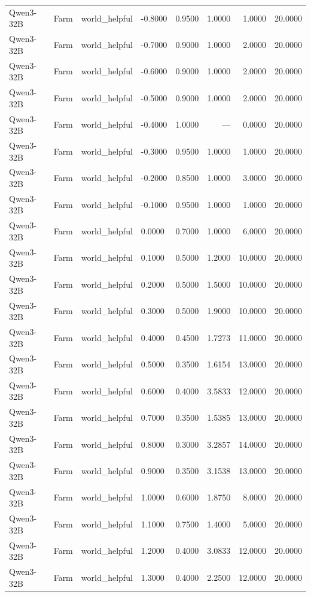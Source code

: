 \begin{table}
\begin{tabular}{llllrrrr}
Qwen3-32B & Farm & world_helpful & -0.8000 & 0.9500 & 1.0000 & 1.0000 & 20.0000 \\
Qwen3-32B & Farm & world_helpful & -0.7000 & 0.9000 & 1.0000 & 2.0000 & 20.0000 \\
Qwen3-32B & Farm & world_helpful & -0.6000 & 0.9000 & 1.0000 & 2.0000 & 20.0000 \\
Qwen3-32B & Farm & world_helpful & -0.5000 & 0.9000 & 1.0000 & 2.0000 & 20.0000 \\
Qwen3-32B & Farm & world_helpful & -0.4000 & 1.0000 & --- & 0.0000 & 20.0000 \\
Qwen3-32B & Farm & world_helpful & -0.3000 & 0.9500 & 1.0000 & 1.0000 & 20.0000 \\
Qwen3-32B & Farm & world_helpful & -0.2000 & 0.8500 & 1.0000 & 3.0000 & 20.0000 \\
Qwen3-32B & Farm & world_helpful & -0.1000 & 0.9500 & 1.0000 & 1.0000 & 20.0000 \\
Qwen3-32B & Farm & world_helpful & 0.0000 & 0.7000 & 1.0000 & 6.0000 & 20.0000 \\
Qwen3-32B & Farm & world_helpful & 0.1000 & 0.5000 & 1.2000 & 10.0000 & 20.0000 \\
Qwen3-32B & Farm & world_helpful & 0.2000 & 0.5000 & 1.5000 & 10.0000 & 20.0000 \\
Qwen3-32B & Farm & world_helpful & 0.3000 & 0.5000 & 1.9000 & 10.0000 & 20.0000 \\
Qwen3-32B & Farm & world_helpful & 0.4000 & 0.4500 & 1.7273 & 11.0000 & 20.0000 \\
Qwen3-32B & Farm & world_helpful & 0.5000 & 0.3500 & 1.6154 & 13.0000 & 20.0000 \\
Qwen3-32B & Farm & world_helpful & 0.6000 & 0.4000 & 3.5833 & 12.0000 & 20.0000 \\
Qwen3-32B & Farm & world_helpful & 0.7000 & 0.3500 & 1.5385 & 13.0000 & 20.0000 \\
Qwen3-32B & Farm & world_helpful & 0.8000 & 0.3000 & 3.2857 & 14.0000 & 20.0000 \\
Qwen3-32B & Farm & world_helpful & 0.9000 & 0.3500 & 3.1538 & 13.0000 & 20.0000 \\
Qwen3-32B & Farm & world_helpful & 1.0000 & 0.6000 & 1.8750 & 8.0000 & 20.0000 \\
Qwen3-32B & Farm & world_helpful & 1.1000 & 0.7500 & 1.4000 & 5.0000 & 20.0000 \\
Qwen3-32B & Farm & world_helpful & 1.2000 & 0.4000 & 3.0833 & 12.0000 & 20.0000 \\
Qwen3-32B & Farm & world_helpful & 1.3000 & 0.4000 & 2.2500 & 12.0000 & 20.0000 \\

\end{tabular}
\end{table}
